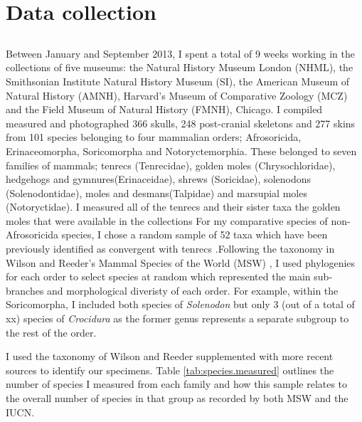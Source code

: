 \section{Data collection}
\label{sect:datacollection}


\subsection{}

	Between January and September 2013, I spent a total of 9 weeks working in the collections of five museums: the Natural History Museum London (NHML), the Smithsonian Institute Natural History Museum (SI), the American Museum of Natural History (AMNH), Harvard’s Museum of Comparative Zoology (MCZ) and the Field Museum of Natural History (FMNH), Chicago. I compiled measured and photographed 366 skulls, 248 post-cranial skeletons and 277 skins from 101 species belonging to four mammalian orders; Afrosoricida, Erinaceomorpha, Soricomorpha and Notoryctemorphia. 
	These belonged to seven families of mammals; tenrecs (Tenrecidae), golden moles (Chrysochloridae), hedgehogs and gymnures(Erinaceidae), shrews (Soricidae), solenodons (Solenodontidae), moles and desmans(Talpidae) and marsupial moles (Notoryctidae).
	I measured all of the tenrecs and their sister taxa the golden moles that were available in the collections %
	For my comparative species of non-Afrosoricida species, I chose a random sample of 52 taxa %
	which have been previously identified as convergent with tenrecs \citep[e.g.][]{Gould1966, Symonds2005, Poux2008, Olson2013}.Following the taxonomy in Wilson and Reeder's Mammal Species of the World (MSW) \citeyearpar{Wilson2005}, I used phylogenies for each order to select species at random which represented the main sub-branches and morphological diveristy of each order. For example, within the Soricomorpha, I included both species of \textit{Solenodon} but only 3 %
	(out of a total of xx) species of \textit{Crocidura} as the former genus represents a separate subgroup to the rest of the order. 

	I used the taxonomy of Wilson and Reeder \citeyearpar{Wilson2005} supplemented with more recent sources \citep{IUCN2012, Olson2013} to identify our specimens. Table \ref{tab:species.measured} outlines the number of species I measured from each family and how this sample relates to the overall number of species in that group as recorded by both MSW and the IUCN.


